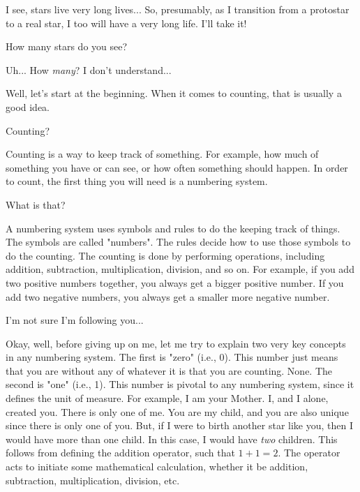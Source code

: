 \documentclass[main.tex]{subfiles}
\begin{document}
\par \Maia I see, stars live very long lives...  So, presumably, as I transition from a protostar to a real star, I too will have a very long life.  I'll take it!  

\par \Pleione How many stars do you see?

\par \Maia Uh... How \textit{many}?  I don't understand...

\par \Pleione Well, let's start at the beginning.  When it comes to counting, that is usually a good idea.

\par \Maia Counting?

\par \Pleione  Counting is a way to keep track of something.  For example, how much of something you have or can see, or how often something should happen.  In order to count, the first thing you will need is a numbering system.


\par \Maia What is that?

\par \Pleione A numbering system uses symbols and rules to do the keeping track of things.  The symbols are called "numbers".  The rules decide how to use those symbols to do the counting.  The counting is done by performing operations, including addition, subtraction, multiplication, division, and so on.  For example, if you add two positive numbers together, you always get a bigger positive number.  If you add two negative numbers, you always get a smaller more negative number.  

\par \Maia I'm not sure I'm following you...

\par \Pleione Okay, well, before giving up on me, let me try to explain two very key concepts in any numbering system.  The first is "zero" (i.e., 0).  This number just means that you are without any of whatever it is that you are counting.  None.  The second is "one" (i.e., 1).  This number is pivotal to any numbering system, since it defines the unit of measure.  For example, I am your Mother.  I, and I alone, created you.  There is only one of me.  You are my child, and you are also unique since there is only one of you.  But, if I were to birth another star like you, then I would have more than one child.  In this case, I would have \textit{two} children.  This follows from defining the addition operator, such that $1 + 1 = 2$.  The operator acts to initiate some mathematical calculation, whether it be addition, subtraction, multiplication, division, etc.
\end{document}
